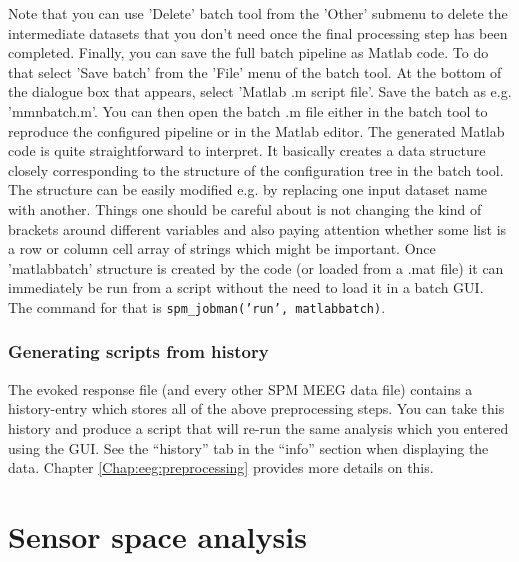 Note that you can use 'Delete' batch tool from the 'Other' submenu to delete the intermediate datasets that you don't need once the final processing step has been completed. Finally, you can save the full batch pipeline as Matlab code. To do that select 'Save batch' from the 'File' menu of the batch tool. At the bottom of the dialogue box that appears, select 'Matlab .m script file'. Save the batch as e.g. 'mmnbatch.m'. You can then open the batch .m file either in the batch tool to reproduce the configured pipeline or in the Matlab editor. The generated Matlab code is quite straightforward to interpret. It basically creates a data structure closely corresponding to the structure of the configuration tree in the batch tool. The structure can be easily modified e.g. by replacing one input dataset name with another. Things one should be careful about is not changing the kind of brackets around different variables and also paying attention whether some list is a row or column cell array of strings which might be important. Once 'matlabbatch' structure is created by the code (or loaded from a .mat file) it can immediately be run from a script without the need to load it in a batch GUI. The command for that is \texttt{spm\_jobman('run', matlabbatch)}.

\subsubsection{Generating scripts from history}
The evoked response file (and every other SPM MEEG data file) contains a history-entry which stores all of the above preprocessing steps. You can take this history and produce a script that will re-run the same analysis which you entered using the GUI. See the ``history'' tab in the ``info'' section when displaying the data. Chapter \ref{Chap:eeg:preprocessing} provides more details on this.

\section{Sensor space analysis}

